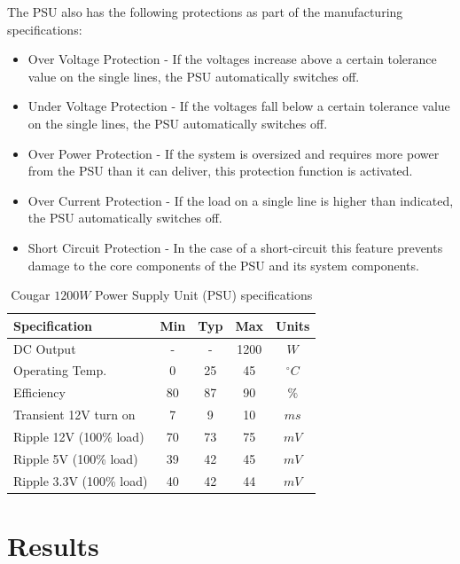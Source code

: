 \documentclass[fleqn,twoside,12pt]{report}
\begin{document}
The PSU also has the following protections as part of the manufacturing specifications:

\begin{itemize}
	\item Over Voltage Protection - If the voltages increase above a certain tolerance value on the single lines, the PSU automatically switches off.
	\item Under Voltage Protection - If the voltages fall below a certain tolerance value on the single lines, the PSU automatically switches off.
	\item Over Power Protection - If the system is oversized and requires more power from the PSU than it can deliver, this protection function is activated.
	\item Over Current Protection - If the load on a single line is higher than indicated, the PSU automatically switches off.
	\item Short Circuit Protection - In the case of a short-circuit this feature prevents damage to the core components of the PSU and its system components.
\end{itemize}

\quad
\begin{table}[h]
	\centering
	\caption{Cougar $1200W$ Power Supply Unit (PSU) specifications}
	\label{tab:psu_spec}
	\begin{tabular}{l*{4}{c}}	
		\toprule 
		Specification & Min & Typ & Max & Units\\ 
		\midrule
		DC Output & - & - & 1200 & $W$ \\[6pt]
		Operating Temp. & 0 & 25 & 45 & $^{\circ}C$ \\[6pt]
		Efficiency & 80 & 87 & 90 & $\%$ \\[6pt]
		Transient 12V turn on & 7 & 9 & 10 & $ms$ \\[6pt]	
		Ripple 12V (100\% load) & 70 & 73 & 75 & $mV$ \\[6pt]
		Ripple 5V (100\% load) & 39 & 42 & 45 & $mV$ \\[6pt]
		Ripple 3.3V (100\% load) & 40 & 42 & 44 & $mV$ \\[6pt]
		
		\bottomrule
	\end{tabular}
\end{table}

\section{Results}
\end{document}
